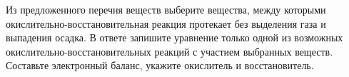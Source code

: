 Из предложенного перечня веществ выберите вещества, между которыми окислительно-восстановительная реакция протекает без выделения газа и выпадения осадка. В ответе запишите уравнение только одной из возможных окислительно-восстановительных реакций с участием выбранных веществ. Составьте электронный баланс, укажите окислитель и восстановитель.

